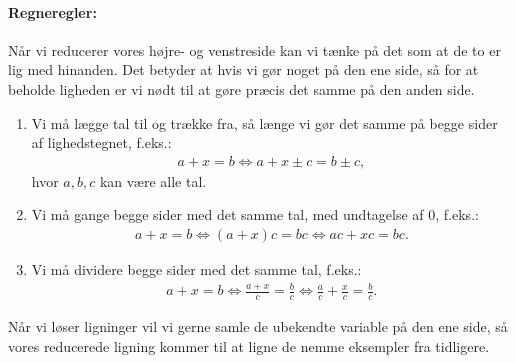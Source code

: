 \paragraph*{Regneregler:}
Når vi reducerer vores højre- og venstreside kan vi tænke på det som at de to er lig med hinanden. Det betyder at hvis vi gør noget på den ene side, så for at beholde ligheden er vi nødt til at gøre præcis det samme på den anden side.
\begin{enumerate}
\item Vi må lægge tal til og trække fra, så længe vi gør det samme på begge sider af lighedstegnet, f.eks.:
\begin{align*}
a + x = b \Leftrightarrow a+x \pm c = b \pm c, 
\end{align*}
hvor $a,b,c$ kan være alle tal.
\item Vi må gange begge sider med det samme tal, med undtagelse af $0$, f.eks.:
\begin{align*}
a + x = b \Leftrightarrow (a + x)c = bc \Leftrightarrow ac + xc = bc. 
\end{align*}
\item Vi må dividere begge sider med det samme tal, f.eks.:
\begin{align*}
a + x = b \Leftrightarrow \frac{a+x}{c} = \frac{b}{c} \Leftrightarrow \frac{a}{c}  + \frac{x}{c} = \frac{b}{c}.
\end{align*}
\end{enumerate}
Når vi løser ligninger vil vi gerne samle de ubekendte variable på den ene side, så vores reducerede ligning kommer til at ligne de nemme eksempler fra tidligere.

